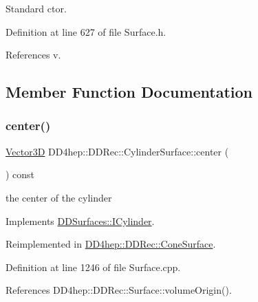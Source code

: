 Standard c\textquotesingle{}tor. 



Definition at line 627 of file Surface.\+h.



References v.



\subsection{Member Function Documentation}
\hypertarget{class_d_d4hep_1_1_d_d_rec_1_1_cylinder_surface_a8043392b62836fcf8f4f0eca596721c9}{}\label{class_d_d4hep_1_1_d_d_rec_1_1_cylinder_surface_a8043392b62836fcf8f4f0eca596721c9} 
\subsubsection{\texorpdfstring{center()}{center()}}
{\footnotesize\ttfamily \hyperlink{class_d_d_surfaces_1_1_vector3_d}{Vector3D} D\+D4hep\+::\+D\+D\+Rec\+::\+Cylinder\+Surface\+::center (\begin{DoxyParamCaption}{ }\end{DoxyParamCaption}) const\hspace{0.3cm}{\ttfamily [virtual]}}



the center of the cylinder 



Implements \hyperlink{class_d_d_surfaces_1_1_i_cylinder_acebccc0b84cc5b7e53bb2e56fb991f16}{D\+D\+Surfaces\+::\+I\+Cylinder}.



Reimplemented in \hyperlink{class_d_d4hep_1_1_d_d_rec_1_1_cone_surface_ad3fe5b411845bd6985c049e703351843}{D\+D4hep\+::\+D\+D\+Rec\+::\+Cone\+Surface}.



Definition at line 1246 of file Surface.\+cpp.



References D\+D4hep\+::\+D\+D\+Rec\+::\+Surface\+::volume\+Origin().

\hypertarget{class_d_d4hep_1_1_d_d_rec_1_1_cylinder_surface_a020b7f61ba490d05d9473250714d6d5f}{}\label{class_d_d4hep_1_1_d_d_rec_1_1_cylinder_surface_a020b7f61ba490d05d9473250714d6d5f} 
